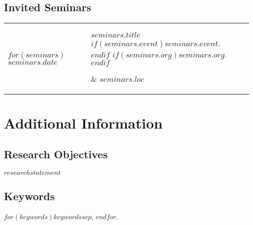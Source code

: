 \documentclass[martgin, line]{article}
\begin{document}
\subsection*{Invited Seminars}

\setlength{\extrarowheight}{.75em}
\begin{longtable}[l]{lp{3.75in}l}
  $for(seminars)$
  $seminars.date$&
  \parbox[t]{3.75in} { $seminars.title$\\
    \scriptsize{%
      $if(seminars.event)$\textit{$seminars.event$}. $endif$%
      $if(seminars.org)$$seminars.org$.$endif$%
    }} & $seminars.loc$\\
  $endfor$
\end{longtable}
\setlength{\extrarowheight}{0em}

\section*{Additional Information}

\subsection*{Research Objectives}
$researchstatement$

\subsection*{Keywords}
$for(keywords)$$keywords$$sep$, $endfor$.
\end{document}
